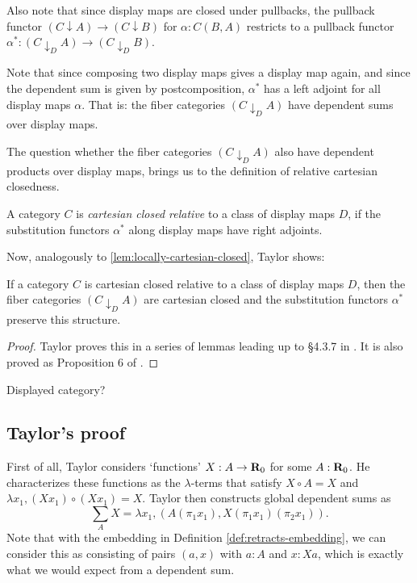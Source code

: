Also note that since display maps are closed under pullbacks, the pullback functor $ (C \downarrow A) \to (C \downarrow B) $ for $ \alpha: C(B, A) $ restricts to a pullback functor $ \alpha^*: (C \downarrow_D A) \to (C \downarrow_D B) $.

Note that since composing two display maps gives a display map again, and since the dependent sum is given by postcomposition, $ \alpha^* $ has a left adjoint for all display maps $ \alpha $. That is: the fiber categories $ (C \downarrow_D A) $ have dependent sums over display maps.

The question whether the fiber categories $ (C \downarrow_D A) $ also have dependent products over display maps, brings us to the definition of relative cartesian closedness.
\begin{definition}
  A category $ C $ is \textit{cartesian closed relative} to a class of display maps $ D $, if the substitution functors $ \alpha^* $ along display maps have right adjoints.
\end{definition}

Now, analogously to \ref{lem:locally-cartesian-closed}, Taylor shows:
\begin{lemma}
  If a category $ C $ is cartesian closed relative to a class of display maps $ D $, then the fiber categories $ (C \downarrow_D A) $ are cartesian closed and the substitution functors $ \alpha^* $ preserve this structure.
\end{lemma}
\begin{proof}
  Taylor proves this in a series of lemmas leading up to \S 4.3.7 in \cite{taylor}. It is also proved as Proposition 6 of \cite{theory-of-constructions}.
\end{proof}

\TODO Displayed category?

\subsection{Taylor's proof}

First of all, Taylor considers `functions' $ X: A \to \mathbf{R}_0 $ for some $ A : \mathbf{R}_0 $. He characterizes these functions as the $ \lambda $-terms that satisfy $ X \circ A = X $ and $ \lambda x_1, (X x_1) \circ (X x_1) = X $. Taylor then constructs global dependent sums as
\[ \sum_A X = \lambda x_1, (A (\pi_1 x_1), X (\pi_1 x_1) (\pi_2 x_1)). \]
Note that with the embedding in Definition \ref{def:retracts-embedding}, we can consider this as consisting of pairs $ (a, x) $ with $ a : A $ and $ x : X a $, which is exactly what we would expect from a dependent sum.

